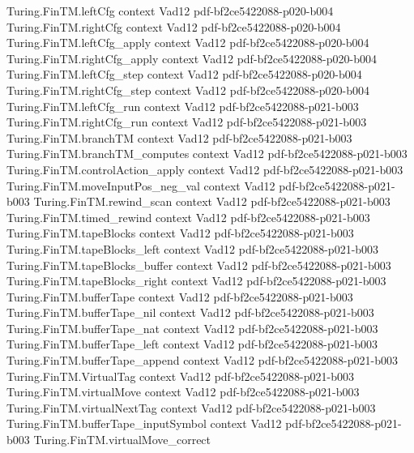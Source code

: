 \begin{theorem}
  {Turing.FinTM.leftCfg}
  {context}
  {Vad12}
  {pdf-bf2ce5422088-p020-b004}
\proofstep
  {Turing.FinTM.rightCfg}
  {context}
  {Vad12}
  {pdf-bf2ce5422088-p020-b004}
\proofstep
  {Turing.FinTM.leftCfg_apply}
  {context}
  {Vad12}
  {pdf-bf2ce5422088-p020-b004}
\proofstep
  {Turing.FinTM.rightCfg_apply}
  {context}
  {Vad12}
  {pdf-bf2ce5422088-p020-b004}
\proofstep
  {Turing.FinTM.leftCfg_step}
  {context}
  {Vad12}
  {pdf-bf2ce5422088-p020-b004}
\proofstep
  {Turing.FinTM.rightCfg_step}
  {context}
  {Vad12}
  {pdf-bf2ce5422088-p020-b004}
\proofstep
  {Turing.FinTM.leftCfg_run}
  {context}
  {Vad12}
  {pdf-bf2ce5422088-p021-b003}
\proofstep
  {Turing.FinTM.rightCfg_run}
  {context}
  {Vad12}
  {pdf-bf2ce5422088-p021-b003}
\proofstep
  {Turing.FinTM.branchTM}
  {context}
  {Vad12}
  {pdf-bf2ce5422088-p021-b003}
\proofstep
  {Turing.FinTM.branchTM_computes}
  {context}
  {Vad12}
  {pdf-bf2ce5422088-p021-b003}
\proofstep
  {Turing.FinTM.controlAction_apply}
  {context}
  {Vad12}
  {pdf-bf2ce5422088-p021-b003}
\proofstep
  {Turing.FinTM.moveInputPos_neg_val}
  {context}
  {Vad12}
  {pdf-bf2ce5422088-p021-b003}
\proofstep
  {Turing.FinTM.rewind_scan}
  {context}
  {Vad12}
  {pdf-bf2ce5422088-p021-b003}
\proofstep
  {Turing.FinTM.timed_rewind}
  {context}
  {Vad12}
  {pdf-bf2ce5422088-p021-b003}
\proofstep
  {Turing.FinTM.tapeBlocks}
  {context}
  {Vad12}
  {pdf-bf2ce5422088-p021-b003}
\proofstep
  {Turing.FinTM.tapeBlocks_left}
  {context}
  {Vad12}
  {pdf-bf2ce5422088-p021-b003}
\proofstep
  {Turing.FinTM.tapeBlocks_buffer}
  {context}
  {Vad12}
  {pdf-bf2ce5422088-p021-b003}
\proofstep
  {Turing.FinTM.tapeBlocks_right}
  {context}
  {Vad12}
  {pdf-bf2ce5422088-p021-b003}
\proofstep
  {Turing.FinTM.bufferTape}
  {context}
  {Vad12}
  {pdf-bf2ce5422088-p021-b003}
\proofstep
  {Turing.FinTM.bufferTape_nil}
  {context}
  {Vad12}
  {pdf-bf2ce5422088-p021-b003}
\proofstep
  {Turing.FinTM.bufferTape_nat}
  {context}
  {Vad12}
  {pdf-bf2ce5422088-p021-b003}
\proofstep
  {Turing.FinTM.bufferTape_left}
  {context}
  {Vad12}
  {pdf-bf2ce5422088-p021-b003}
\proofstep
  {Turing.FinTM.bufferTape_append}
  {context}
  {Vad12}
  {pdf-bf2ce5422088-p021-b003}
\proofstep
  {Turing.FinTM.VirtualTag}
  {context}
  {Vad12}
  {pdf-bf2ce5422088-p021-b003}
\proofstep
  {Turing.FinTM.virtualMove}
  {context}
  {Vad12}
  {pdf-bf2ce5422088-p021-b003}
\proofstep
  {Turing.FinTM.virtualNextTag}
  {context}
  {Vad12}
  {pdf-bf2ce5422088-p021-b003}
\proofstep
  {Turing.FinTM.bufferTape_inputSymbol}
  {context}
  {Vad12}
  {pdf-bf2ce5422088-p021-b003}
\proofstep
  {Turing.FinTM.virtualMove_correct}

\end{theorem}
